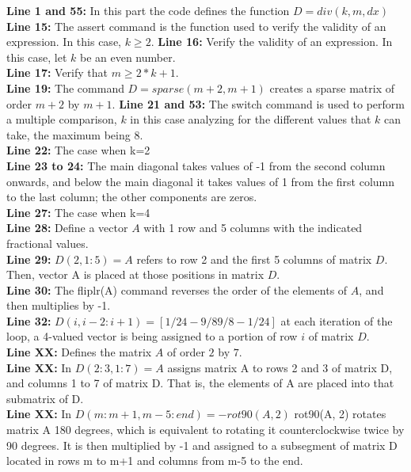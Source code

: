 \textbf{Line 1 and 55:} In this part the code defines the function $D = div(k, m, dx)$\\
\textbf{Line 15:} The assert command is the function used to verify the validity of an expression. In this case, $k \geq 2$.
\textbf{Line 16:} Verify the validity of an expression. In this case, let $k$ be an even number.\\
\textbf{Line 17:} Verify that $m \geq 2*k+1$.\\
\textbf{Line 19:} The command $D = sparse(m+2, m+1)$ creates a sparse matrix of order $m+2$ by $m+1$.
\textbf{Line 21 and 53:} The switch command is used to perform a multiple comparison, $k$ in this case analyzing for the different values ​​that $k$ can take, the maximum being 8.\\
\textbf{Line 22:} The case when k=2\\
\textbf{Line 23 to 24:}  The main diagonal takes values ​​of -1 from the second column onwards, and below the main diagonal it takes values ​​of 1 from the first column to the last column; the other components are zeros.\\
\textbf{Line 27:} The case when k=4\\

\textbf{Line 28:} Define a vector $A$ with 1 row and 5 columns with the indicated fractional values.\\

\textbf{Line 29:} $D(2, 1:5) = A$ refers to row 2 and the first 5 columns of matrix $D$. Then, vector A is placed at those positions in matrix $D$.\\

\textbf{Line 30:} The fliplr(A) command reverses the order of the elements of $A$, and then multiplies by -1.\\

\textbf{Line 32:} $D(i, i-2:i+1) = [1/24 -9/8 9/8 -1/24]$ at each iteration of the loop, a 4-valued vector is being assigned to a portion of row $i$ of matrix $D$.\\


\textbf{Line XX:} Defines the matrix $A$ of order $2$ by $7$.\\


\textbf{Line XX:} In $D(2:3, 1:7) = A$ assigns matrix A to rows 2 and 3 of matrix D, and columns 1 to 7 of matrix D. That is, the elements of A are placed into that submatrix of D.\\


\textbf{Line XX:} In $D(m:m+1, m-5:end) = -rot90(A,2)$ rot90(A, 2) rotates matrix A 180 degrees, which is equivalent to rotating it counterclockwise twice by 90 degrees. It is then multiplied by -1 and assigned to a subsegment of matrix D located in rows m to m+1 and columns from m-5 to the end.


